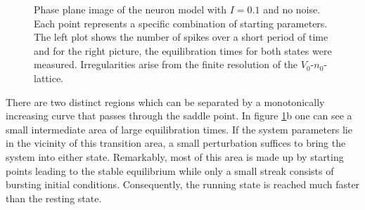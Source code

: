 \documentclass[12pt,a4paper]{article}
\begin{document}
\begin{figure}[H]
	\hspace*{-0.5cm}
	
	\caption{Phase plane image of the neuron model with $I=0.1$ and no noise. Each point represents a specific combination of starting parameters. The left plot shows the number of spikes over a short period of time and for the right picture, the equilibration times for both states were measured. Irregularities arise from the finite resolution of the $V_0$-$n_0$-lattice.}
	\label{twodom}
\end{figure}		
There are two distinct regions which can be separated by a monotonically increasing curve that passes through the saddle point. In figure \ref{twodom}b one can see a small intermediate area of large equilibration times. If the system parameters lie in the vicinity of this transition area, a small perturbation suffices to bring the system into either state. Remarkably, most of this area is made up by starting points leading to the stable equilibrium while only a small streak consists of bursting initial conditions. Consequently, the running state is reached much faster than the resting state.
\end{document}
